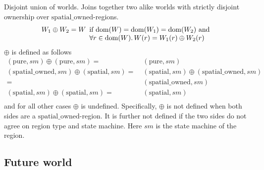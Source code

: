 \documentclass[a3paper]{article}
\newcommand{\dom}{\mathrm{dom}}
\newcommand{\tand}{\text{ and }}
\newcommand{\spatial}{\mathrm{spatial}}
\newcommand{\spatialo}{\mathrm{spatial\_owned}}
\newcommand{\pure}{\mathrm{pure}}
\newcommand{\var}[1]{\mathit{#1}}
\begin{document}
Disjoint union of worlds. Joins together two alike worlds with strictly disjoint ownership over $\spatialo$-regions.
\[
  W_1 \oplus W_2 = W
  \begin{array}[t]{l}
    \text{if $\dom(W) = \dom(W_1) = \dom(W_2) \tand$} \\
    \forall r \in \dom(W) \ldotp W(r) = W_1(r) \oplus W_2(r)
  \end{array}
\]
$\oplus$ is defined as follows
\begin{align*}
  (\pure,\var{sm}) \oplus (\pure,\var{sm}) =  & \; (\pure,\var{sm}) \\
  (\spatialo,\var{sm}) \oplus (\spatial,\var{sm}) = & \; (\spatial,\var{sm}) \oplus (\spatialo,\var{sm})\\
                                           =  & \; (\spatialo,\var{sm}) \\
  (\spatial,\var{sm}) \oplus (\spatial,\var{sm}) =  & \; (\spatial,\var{sm}) \\
\end{align*}
and for all other cases $\oplus$ is undefined. Specifically, $\oplus$ is not defined when both sides are a $\spatialo$-region. It is further not defined if the two sides do not agree on region type and state machine. Here $\var{sm}$ is the state machine of the region.

\subsection{Future world}
\end{document}
